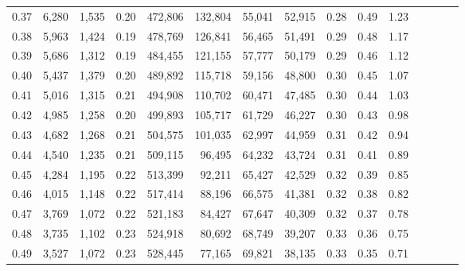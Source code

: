\begin{tabular}{rrrcrrrrrrrrrrr}
0.37 &   6,280 &   1,535 &                                       0.20 &  472,806 &  132,804 &   55,041 &   52,915 &  0.28 &  0.49 &                         1.23 \\
0.38 &   5,963 &   1,424 &                                       0.19 &  478,769 &  126,841 &   56,465 &   51,491 &  0.29 &  0.48 &                         1.17 \\
0.39 &   5,686 &   1,312 &                                       0.19 &  484,455 &  121,155 &   57,777 &   50,179 &  0.29 &  0.46 &                         1.12 \\
0.40 &   5,437 &   1,379 &                                       0.20 &  489,892 &  115,718 &   59,156 &   48,800 &  0.30 &  0.45 &                         1.07 \\
0.41 &   5,016 &   1,315 &                                       0.21 &  494,908 &  110,702 &   60,471 &   47,485 &  0.30 &  0.44 &                         1.03 \\
0.42 &   4,985 &   1,258 &                                       0.20 &  499,893 &  105,717 &   61,729 &   46,227 &  0.30 &  0.43 &                         0.98 \\
0.43 &   4,682 &   1,268 &                                       0.21 &  504,575 &  101,035 &   62,997 &   44,959 &  0.31 &  0.42 &                         0.94 \\
0.44 &   4,540 &   1,235 &                                       0.21 &  509,115 &   96,495 &   64,232 &   43,724 &  0.31 &  0.41 &                         0.89 \\
0.45 &   4,284 &   1,195 &                                       0.22 &  513,399 &   92,211 &   65,427 &   42,529 &  0.32 &  0.39 &                         0.85 \\
0.46 &   4,015 &   1,148 &                                       0.22 &  517,414 &   88,196 &   66,575 &   41,381 &  0.32 &  0.38 &                         0.82 \\
0.47 &   3,769 &   1,072 &                                       0.22 &  521,183 &   84,427 &   67,647 &   40,309 &  0.32 &  0.37 &                         0.78 \\
0.48 &   3,735 &   1,102 &                                       0.23 &  524,918 &   80,692 &   68,749 &   39,207 &  0.33 &  0.36 &                         0.75 \\
0.49 &   3,527 &   1,072 &                                       0.23 &  528,445 &   77,165 &   69,821 &   38,135 &  0.33 &  0.35 &                         0.71 \\

\end{tabular}
